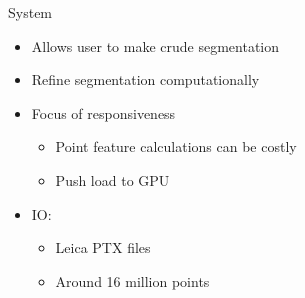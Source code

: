 \documentclass{beamer}
\begin{document}
\begin{frame}{System}

\begin{itemize}
\item Allows user to make crude segmentation
\item Refine segmentation computationally
\item Focus of responsiveness
\begin{itemize}
\item Point feature calculations can be costly
\item Push load to GPU
\end{itemize}
\item IO:
\begin{itemize}
\item Leica PTX files
\item Around 16 million points %
\end{itemize}

\end{itemize}

\end{frame}
\end{document}
